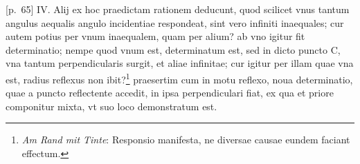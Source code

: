 \pend \pstart {} [p.~65] IV. Alij ex hoc praedictam rationem deducunt, quod scilicet vnus tantum angulus aequalis angulo incidentiae\protect{}\protect{}\protect{} respondeat, sint vero infiniti inaequales; cur autem potius per vnum inaequalem, quam per alium? ab vno igitur fit determinatio; nempe quod vnum est, determinatum est, sed in dicto puncto C, vna tantum perpendicularis surgit, et aliae infinitae; cur igitur per illam quae vna est, radius reflexus\protect{} non ibit?\footnote{\textit{Am Rand mit Tinte}: Responsio manifesta, ne diversae causae eundem faciant effectum.} praesertim cum in motu reflexo\protect{}, noua determinatio, quae a puncto reflectente accedit, in ipsa perpendiculari fiat, ex qua et priore componitur mixta, vt suo loco demonstratum est.